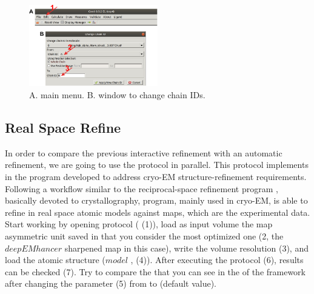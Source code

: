  \begin{figure}[H]
  \centering 
  \captionsetup{width=.9\linewidth} 
  \includegraphics[width=0.5\textwidth]{Images/Fig74}
  \caption{A. \coot main menu. B. \coot window to change chain IDs.}
  \label{fig:chimerax_asymm_unit_2}
  \end{figure}
 
 
 \subsection*{\phenix Real Space Refine}
 
 In order to compare the previous \coot interactive refinement with an automatic refinement, we are going to use the
  protocol in parallel. This protocol implements in \scipion the  program developed to address cryo-EM structure-refinement requirements. Following a workflow similar to the \phenix reciprocal-space refinement program , basically devoted to crystallography,  program, mainly used in cryo-EM, is able to refine in real space atomic models against maps, which are the experimental data.\\
 
 Start working by opening  protocol ( (1)), load as input volume the map asymmetric unit saved in \coot that you consider the most optimized one (2, the $deepEMhancer$ sharpened map in this case), write the volume resolution (3), and load the atomic structure ($model$ , (4)). After executing the protocol (6), results can be checked (7). Try to compare the 
that you can see in the  of the \scipion framework after changing the  parameter  (5) from  to  (default value). 

